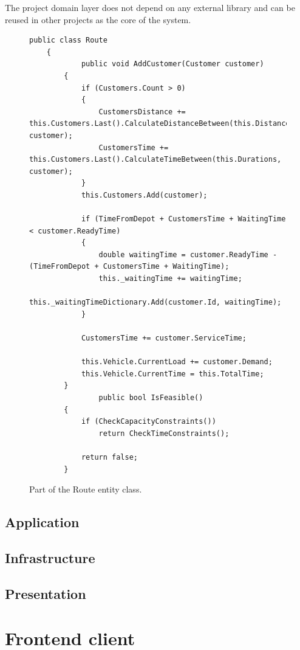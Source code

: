 \documentclass[a4paper,twoside,12pt]{book}
\begin{document}
The project domain layer does not depend on any external library and can be reused in other projects as the core of the system.

\begin{figure}
\centering
\begin{lstlisting}
public class Route
    {
            public void AddCustomer(Customer customer)
        {
            if (Customers.Count > 0)
            {
                CustomersDistance += this.Customers.Last().CalculateDistanceBetween(this.Distances, customer);
                CustomersTime += this.Customers.Last().CalculateTimeBetween(this.Durations, customer);
            }
            this.Customers.Add(customer);

            if (TimeFromDepot + CustomersTime + WaitingTime < customer.ReadyTime)
            {
                double waitingTime = customer.ReadyTime - (TimeFromDepot + CustomersTime + WaitingTime);
                this._waitingTime += waitingTime;
                this._waitingTimeDictionary.Add(customer.Id, waitingTime);
            }

            CustomersTime += customer.ServiceTime;

            this.Vehicle.CurrentLoad += customer.Demand;
            this.Vehicle.CurrentTime = this.TotalTime;
        }
                public bool IsFeasible()
        {
            if (CheckCapacityConstraints())
                return CheckTimeConstraints();

            return false;
        }
\end{lstlisting}
\caption{Part of the Route entity class.}
\label{fig:routeMethod}
\end{figure}




\subsection{Application}

\subsection{Infrastructure}

\subsection{Presentation}

\section{Frontend client}
\end{document}
